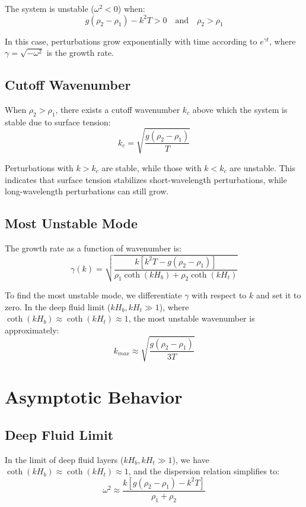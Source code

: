 \documentclass[12pt,a4paper]{article}
\begin{document}
The system is unstable ($\omega^2 < 0$) when:
\begin{equation}
g(\rho_2 - \rho_1) - k^2T > 0 \quad \text{and} \quad \rho_2 > \rho_1
\end{equation}

In this case, perturbations grow exponentially with time according to $e^{\gamma t}$, where $\gamma = \sqrt{-\omega^2}$ is the growth rate.

\subsection{Cutoff Wavenumber}
When $\rho_2 > \rho_1$, there exists a cutoff wavenumber $k_c$ above which the system is stable due to surface tension:
\begin{equation}
k_c = \sqrt{\frac{g(\rho_2 - \rho_1)}{T}}
\end{equation}

Perturbations with $k > k_c$ are stable, while those with $k < k_c$ are unstable. This indicates that surface tension stabilizes short-wavelength perturbations, while long-wavelength perturbations can still grow.

\subsection{Most Unstable Mode}
The growth rate as a function of wavenumber is:
\begin{equation}
\gamma(k) = \sqrt{\frac{k[k^2T - g(\rho_2 - \rho_1)]}{\rho_1\coth(kH_b) + \rho_2\coth(kH_t)}}
\end{equation}

To find the most unstable mode, we differentiate $\gamma$ with respect to $k$ and set it to zero. In the deep fluid limit ($kH_b, kH_t \gg 1$), where $\coth(kH_b) \approx \coth(kH_t) \approx 1$, the most unstable wavenumber is approximately:
\begin{equation}
k_{max} \approx \sqrt{\frac{g(\rho_2 - \rho_1)}{3T}}
\end{equation}

\section{Asymptotic Behavior}
\subsection{Deep Fluid Limit}
In the limit of deep fluid layers ($kH_b, kH_t \gg 1$), we have $\coth(kH_b) \approx \coth(kH_t) \approx 1$, and the dispersion relation simplifies to:
\begin{equation}
\omega^2 \approx \frac{k[g(\rho_2 - \rho_1) - k^2T]}{\rho_1 + \rho_2}
\end{equation}
\end{document}
